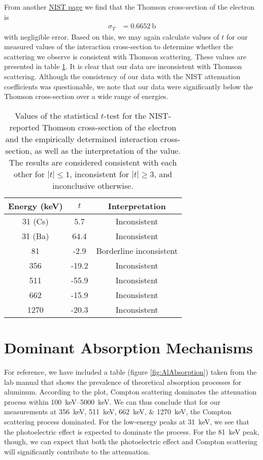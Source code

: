 \documentclass[letter]{article}
\begin{document}
From another \href{https://physics.nist.gov/cgi-bin/cuu/Value?sigmae}{NIST page} we find that the Thomson cross-section of the electron is 
\begin{align} \label{eqn:ThomsonXSec}
\sigma_T &= \qty{0.6652}{\barn}
\end{align}
with negligible error. Based on this, we may again calculate values of $t$ for our measured values of the interaction cross-section to determine whether the scattering we observe is consistent with Thomson scattering. These values are presented in table \ref{tab:tSigma}. It is clear that our data are inconsistent with Thomson scattering. Although the consistency of our data with the NIST attenuation coefficients was questionable, we note that our data were significantly below the Thomson cross-section over a wide range of energies.

\begin{table}[h] 
\centering  \begin{tabular}{ c  c   c } 
Energy (\unit{\kilo\electronvolt}) & $t$ & Interpretation \\ \hline
31 (Cs) & 5.7 & Inconsistent \\ 
31 (Ba) & 64.4 & Inconsistent \\
81 &  -2.9 & Borderline inconsistent\\
356 & -19.2 & Inconsistent\\
511 &  -55.9 & Inconsistent\\
662 & -15.9 & Inconsistent \\
1270 &  -20.3 & Inconsistent
\end{tabular}
\caption{Values of the statistical $t$-test for the NIST-reported Thomson cross-section of the electron and the empirically determined interaction cross-section, as well as the interpretation of the value. The results are considered consistent with each other for $|t| \leq 1$, inconsistent for $|t|\geq3$, and inconclusive otherwise. }
\label{tab:tSigma}
\end{table}


\section{Dominant Absorption Mechanisms}

For reference, we have included a table (figure \ref{fig:AlAbsorption}) taken from the lab manual that shows the prevalence of theoretical absorption processes for aluminum. According to the plot, Compton scattering dominates the attenuation process within \qtyrange{100}{5000}{\kilo\electronvolt}. We can thus conclude that for our measurements at \qtylist{356;511;662;1270}{\kilo\electronvolt}, the Compton scattering process dominated. For the low-energy peaks at \qty{31}{\kilo\electronvolt}, we see that the photoelectric effect is expected to dominate the process. For the \qty{81}{\kilo\electronvolt} peak, though, we can expect that both the photoelectric effect and Compton scattering will significantly contribute to the attenuation. 
\end{document}

